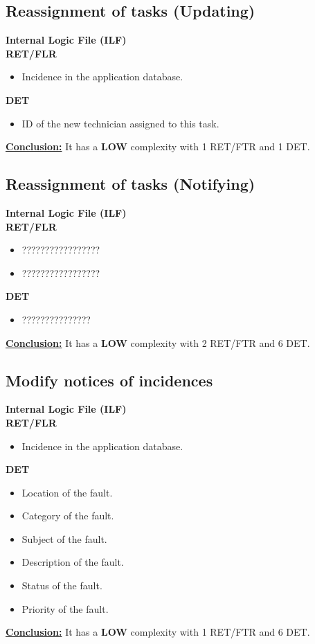 \subsection{Reassignment of tasks (Updating)}
\textbf{Internal Logic File (ILF)} \\ 
\textbf{RET/FLR}
\begin{itemize}
\item Incidence in the application database.
\end{itemize}
\textbf{DET}
\begin{itemize}
\item ID of the new technician assigned to this task.
\end{itemize}
\textbf{\underline{Conclusion:}} It has a \textbf{LOW} complexity with 1 RET/FTR and 1 DET.

\subsection{Reassignment of tasks (Notifying)}
\textbf{Internal Logic File (ILF)} \\ 
\textbf{RET/FLR}
\begin{itemize}
\item ?????????????????
\item ?????????????????
\end{itemize}
\textbf{DET}
\begin{itemize}
\item ???????????????
\end{itemize}
\textbf{\underline{Conclusion:}} It has a \textbf{LOW} complexity with 2 RET/FTR and 6 DET.

\subsection{Modify notices of incidences}
\textbf{Internal Logic File (ILF)} \\ 
\textbf{RET/FLR}
\begin{itemize}
\item Incidence in the application database.
\end{itemize}
\textbf{DET}
\begin{itemize}
\item Location of the fault.
\item Category of the fault.
\item Subject of the fault.
\item Description of the fault.
\item Status of the fault.
\item Priority of the fault.
\end{itemize}
\textbf{\underline{Conclusion:}} It has a \textbf{LOW} complexity with 1 RET/FTR and 6 DET.

